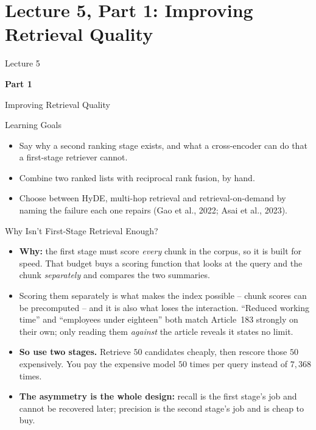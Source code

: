 \section{Lecture 5, Part 1: Improving Retrieval Quality}

\begin{frame}
\vfill
\centering
{\color{RLBlue}\large Lecture 5}

\vspace{0.3em}
{\color{RLBlue}\Large\bfseries Part 1}

\vspace{0.6em}
{\Large Improving Retrieval Quality}
\vfill
\end{frame}

\begin{frame}{Learning Goals}
\begin{itemize}
  \item Say why a second ranking stage exists, and what a cross-encoder can do that a first-stage retriever cannot.
  \pause
  \item Combine two ranked lists with reciprocal rank fusion, by hand.
  \pause
  \item Choose between HyDE, multi-hop retrieval and retrieval-on-demand by naming the failure each one repairs (Gao et al., 2022; Asai et al., 2023).
\end{itemize}
\end{frame}

\begin{frame}{Why Isn't First-Stage Retrieval Enough?}
\begin{itemize}
  \item \textbf{Why:} the first stage must score \emph{every} chunk in the corpus, so it is built for speed. That budget buys a scoring function that looks at the query and the chunk \emph{separately} and compares the two summaries.
  \pause
  \item Scoring them separately is what makes the index possible -- chunk scores can be precomputed -- and it is also what loses the interaction. ``Reduced working time'' and ``employees under eighteen'' both match Article~183 strongly on their own; only reading them \emph{against} the article reveals it states no limit.
  \pause
  \item \textbf{So use two stages.} Retrieve $50$ candidates cheaply, then rescore those $50$ expensively. You pay the expensive model $50$ times per query instead of $7{,}368$ times.
  \pause
  \item \textbf{The asymmetry is the whole design:} recall is the first stage's job and cannot be recovered later; precision is the second stage's job and is cheap to buy.
\end{itemize}
\end{frame}

